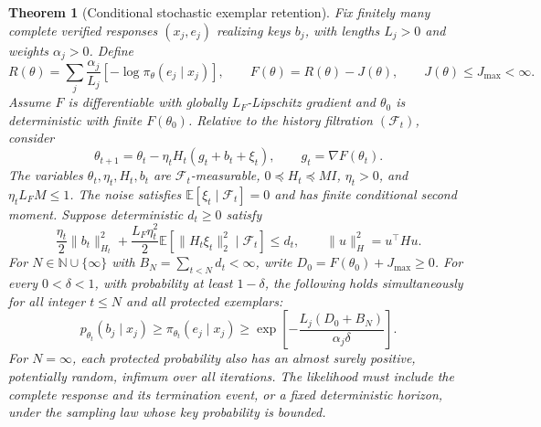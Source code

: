 \documentclass{article}
\newcommand{\1}{\mathbf 1}
\newtheorem{theorem}[lemma]{Theorem}
\theoremstyle{remark}
\theoremstyle{definition}
\theoremstyle{plain}
\begin{document}
\begin{theorem}[Conditional stochastic exemplar retention]
\label{ext:thm-stochastic-retention}
Fix finitely many complete verified responses $(x_j,e_j)$ realizing keys
$b_j$, with lengths $L_j>0$ and weights $\alpha_j>0$. Define
\[
 R(\theta)=\sum_j\frac{\alpha_j}{L_j}
             [-\log\pi_\theta(e_j\mid x_j)],\qquad
 F(\theta)=R(\theta)-J(\theta),\qquad J(\theta)\le J_{\max}<\infty.
\]
Assume $F$ is differentiable with globally $L_F$-Lipschitz gradient and
$\theta_0$ is deterministic with finite $F(\theta_0)$. Relative to the
history filtration $(\mathcal F_t)$, consider
\[
 \theta_{t+1}=\theta_t-\eta_t H_t(g_t+b_t+\xi_t),
 \qquad g_t=\nabla F(\theta_t).
\]
The variables $\theta_t,\eta_t,H_t,b_t$ are $\mathcal F_t$-measurable,
$0\preceq H_t\preceq MI$, $\eta_t>0$, and $\eta_t L_FM\le1$.
The noise satisfies $\mathbb E[\xi_t\mid\mathcal F_t]=0$ and has finite
conditional second moment. Suppose deterministic $d_t\ge0$ satisfy
\begin{equation}
 \frac{\eta_t}{2}\|b_t\|_{H_t}^{2}
 +\frac{L_F\eta_t^2}{2}
       \mathbb E[\|H_t\xi_t\|_2^2\mid\mathcal F_t]\le d_t,
 \qquad \|u\|_H^2=u^\top Hu.
 \label{ext:eq-optimizer-budget}
\end{equation}
For $N\in\mathbb N\cup\{\infty\}$ with
$B_N=\sum_{t<N}d_t<\infty$, write $D_0=F(\theta_0)+J_{\max}\ge0$.
For every $0<\delta<1$, with probability at least $1-\delta$, the following
holds simultaneously for all integer $t\le N$ and all protected exemplars:
\begin{equation}
 p_{\theta_t}(b_j\mid x_j)\ge\pi_{\theta_t}(e_j\mid x_j)
 \ge\exp\!\left[-\frac{L_j(D_0+B_N)}{\alpha_j\delta}\right].
 \label{ext:eq-stochastic-retention}
\end{equation}
For $N=\infty$, each protected probability also has an almost surely
positive, potentially random, infimum over all iterations. The likelihood
must include the complete response and its termination event, or a fixed
deterministic horizon, under the sampling law whose key probability is bounded.
\end{theorem}
\end{document}
